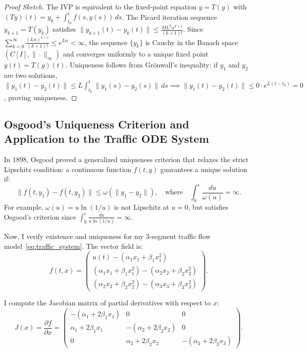 \documentclass[runningheads]{llncs}
\begin{document}
\begin{proof}[Proof Sketch]
The IVP is equivalent to the fixed-point equation $y = T(y)$ with $(Ty)(t) = y_0 + \int_{t_0}^t f(s, y(s)) \, ds$. The Picard iteration sequence $y_{k+1} = T(y_k)$ satisfies $\| y_{k+1}(t) - y_k(t) \| \le \frac{M L^k \alpha^{k+1}}{(k+1)!}$. Since $\sum_{k=0}^\infty \frac{(L\alpha)^{k+1}}{(k+1)!} \le e^{L\alpha} < \infty$, the sequence $\{y_k\}$ is Cauchy in the Banach space $(C[I], \|\cdot\|_\infty)$ and converges uniformly to a unique fixed point $y(t) = T(y)(t)$. Uniqueness follows from Gr\"onwall's inequality: if $y_1$ and $y_2$ are two solutions, $\|y_1(t) - y_2(t)\| \le L \int_{t_0}^t \|y_1(s) - y_2(s)\| \, ds \implies \|y_1(t) - y_2(t)\| \le 0 \cdot e^{L(t - t_0)} = 0$, proving uniqueness.
\end{proof}

\subsection{Osgood's Uniqueness Criterion and Application to the Traffic ODE System}
In 1898, Osgood proved a generalized uniqueness criterion that relaxes the strict Lipschitz condition: a continuous function $f(t, y)$ guarantees a unique solution if:
\begin{equation}
\label{eq:osgood}
\| f(t, y_1) - f(t, y_2) \| \le \omega\left(\|y_1 - y_2\|\right), \quad \text{where} \quad \int_0^\epsilon \frac{du}{\omega(u)} = \infty.
\end{equation}
For example, $\omega(u) = u \ln(1/u)$ is not Lipschitz at $u = 0$, but satisfies Osgood's criterion since $\int_0^\epsilon \frac{du}{u \ln(1/u)} = \infty$.

Now, I verify existence and uniqueness for my 3-segment traffic flow model~\eqref{eq:traffic_system}. The vector field is:
\begin{equation}
f(t, x) = \begin{pmatrix}
u(t) - (\alpha_1 x_1 + \beta_1 x_1^2) \\
(\alpha_1 x_1 + \beta_1 x_1^2) - (\alpha_2 x_2 + \beta_2 x_2^2) \\
(\alpha_2 x_2 + \beta_2 x_2^2) - (\alpha_3 x_3 + \beta_3 x_3^2)
\end{pmatrix}.
\end{equation}

I compute the Jacobian matrix of partial derivatives with respect to $x$:
\begin{equation}
\label{eq:jacobian}
J(x) = \frac{\partial f}{\partial x} = \begin{pmatrix}
-(\alpha_1 + 2\beta_1 x_1) & 0 & 0 \\
\alpha_1 + 2\beta_1 x_1 & -(\alpha_2 + 2\beta_2 x_2) & 0 \\
0 & \alpha_2 + 2\beta_2 x_2 & -(\alpha_3 + 2\beta_3 x_3)
\end{pmatrix}.
\end{equation}
\end{document}
